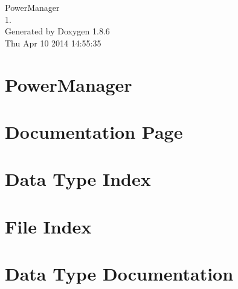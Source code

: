 \documentclass[twoside]{book}
\newcommand{\clearemptydoublepage}{%
  \newpage{\pagestyle{empty}\cleardoublepage}%
}
\begin{document}
\hypersetup{pageanchor=false}
\begin{titlepage}
\vspace*{7cm}
\begin{center}%
{\Large Power\-Manager \\[1ex]\large 1. }\\
\vspace*{1cm}
{\large Generated by Doxygen 1.8.6}\\
\vspace*{0.5cm}
{\small Thu Apr 10 2014 14:55:35}\\
\end{center}
\end{titlepage}
\clearemptydoublepage
\tableofcontents
\clearemptydoublepage
{}
\hypersetup{pageanchor=true}

\chapter{Power\-Manager}
\label{index}\hypertarget{index}{}
\chapter{Documentation Page}
\label{_a}
\hypertarget{_a}{}

\chapter{Data Type Index}

\chapter{File Index}

\chapter{Data Type Documentation}







































\end{document}

